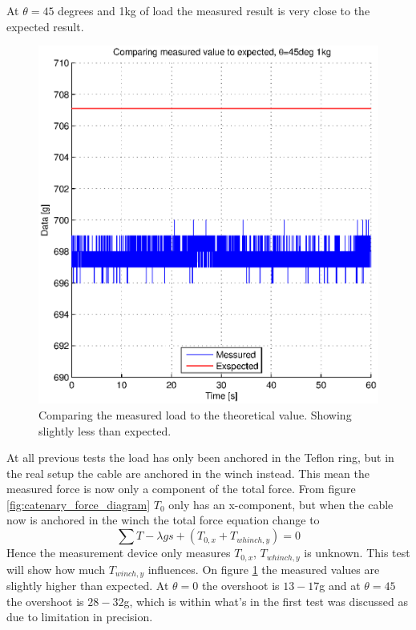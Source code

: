At $\theta=45$ degrees and 1kg of load the measured result is very close to the expected result.

\begin{figure}[H]
\centering
\includegraphics[scale=0.75]{graphics/gcs_test/45degTheta1kg.eps}
\caption[Comparing the measured load to the theoretical value]{Comparing the measured load to the theoretical value. Showing slightly less than expected.}
\label{fig:45degTheta1kg}
\end{figure}

\noindent
At all previous tests the load has only been anchored in the Teflon ring, but in the real setup the cable are anchored in the winch instead. This mean the measured force is now only a component of the total force. From figure \ref{fig:catenary_force_diagram} $T_0$ only has an x-component, but when the cable now is anchored in the winch the total force equation change to
\begin{equation}
\sum T -\lambda gs + (T_{0,x} + T_{whinch,y} ) = 0
\end{equation}
Hence the measurement device only measures $T_{0,x}$, $T_{whinch,y}$ is unknown. This test will show how much $T_{winch,y}$ influences.
On figure \ref{fig:45degTheta1kg} the measured values are slightly higher than expected. At $\theta = 0$ the overshoot is $13-17$g and at $\theta = 45$ the overshoot is $28-32$g, which is within what's in the first test was discussed as due to limitation in precision. 

